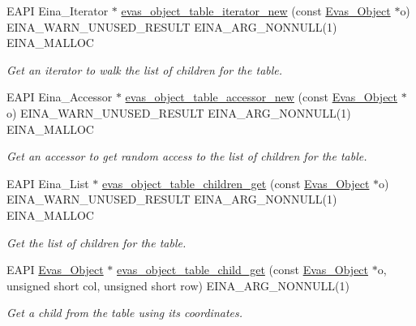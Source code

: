 \begin{DoxyCompactItemize}
EAPI Eina\_\-Iterator $\ast$ \hyperlink{group__Evas__Object__Table_ga07d18d5708745143c4b12280a7359e71}{evas\_\-object\_\-table\_\-iterator\_\-new} (const \hyperlink{group__Evas__Object__Group_ga9e19e6dd1f517a0ba437c0114d3e7c97}{Evas\_\-Object} $\ast$o) EINA\_\-WARN\_\-UNUSED\_\-RESULT EINA\_\-ARG\_\-NONNULL(1) EINA\_\-MALLOC
\begin{DoxyCompactList}\small\item\em Get an iterator to walk the list of children for the table. \item\end{DoxyCompactList}\item 
EAPI Eina\_\-Accessor $\ast$ \hyperlink{group__Evas__Object__Table_gaaa6c5242faad0906b1fbf4bbc1088543}{evas\_\-object\_\-table\_\-accessor\_\-new} (const \hyperlink{group__Evas__Object__Group_ga9e19e6dd1f517a0ba437c0114d3e7c97}{Evas\_\-Object} $\ast$o) EINA\_\-WARN\_\-UNUSED\_\-RESULT EINA\_\-ARG\_\-NONNULL(1) EINA\_\-MALLOC
\begin{DoxyCompactList}\small\item\em Get an accessor to get random access to the list of children for the table. \item\end{DoxyCompactList}\item 
EAPI Eina\_\-List $\ast$ \hyperlink{group__Evas__Object__Table_ga1afb562131cd3a74a130c374fcea0632}{evas\_\-object\_\-table\_\-children\_\-get} (const \hyperlink{group__Evas__Object__Group_ga9e19e6dd1f517a0ba437c0114d3e7c97}{Evas\_\-Object} $\ast$o) EINA\_\-WARN\_\-UNUSED\_\-RESULT EINA\_\-ARG\_\-NONNULL(1) EINA\_\-MALLOC
\begin{DoxyCompactList}\small\item\em Get the list of children for the table. \item\end{DoxyCompactList}\item 
EAPI \hyperlink{group__Evas__Object__Group_ga9e19e6dd1f517a0ba437c0114d3e7c97}{Evas\_\-Object} $\ast$ \hyperlink{group__Evas__Object__Table_gaeb4a9d107dde8a4c7bc60d6f97b5ec46}{evas\_\-object\_\-table\_\-child\_\-get} (const \hyperlink{group__Evas__Object__Group_ga9e19e6dd1f517a0ba437c0114d3e7c97}{Evas\_\-Object} $\ast$o, unsigned short col, unsigned short row) EINA\_\-ARG\_\-NONNULL(1)
\begin{DoxyCompactList}\small\item\em Get a child from the table using its coordinates. \item\end{DoxyCompactList}\item 

\end{DoxyCompactItemize}
